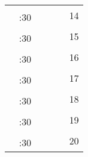 \documentclass[10pt, a5paper, final, oneside]{memoir}
\newcommand{\grayline}{\arrayrulecolor{lightgray}\cline{1-5}\arrayrulecolor{black}}
\begin{document}
\begin{tabularx}{\linewidth}{|c|c|X|X|X|c}
    & & & && \multirow{2}{*}{14}\\ 
    \grayline
    & :30 & & &&\\ \hline
    
    & & & && \multirow{2}{*}{15}\\ 
    \grayline
    & :30 & & &&\\ \hline

    & & & && \multirow{2}{*}{16}\\ 
    \grayline
    & :30 & & &&\\ \hline

    & & & && \multirow{2}{*}{17}\\ 
    \grayline
    & :30 & & &&\\ \hline

    & & & && \multirow{2}{*}{18}\\ 
    \grayline
    & :30 & & &&\\ \hline

    & & & && \multirow{2}{*}{19}\\ 
    \grayline
    & :30 & & &&\\ \hline
    
    & & & && \multirow{2}{*}{20}\\ 
    \grayline
    & :30 & & &&\\ \hline

\end{tabularx}

\newpage
\end{document}
